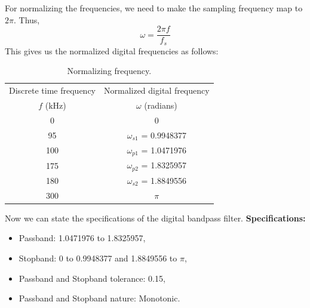 \documentclass[12pt]{article}
\begin{document}
For normalizing the frequencies, we need to make the sampling frequency map to $2\pi$. Thus,
\[\omega = \frac{2\pi f}{f_s}\]
\newpage
This gives us the normalized digital frequencies as follows:
\begin{table}[h]
    \centering
    \begin{tabular}{|c|c|}\hline
         Discrete time frequency&Normalized digital frequency\\
         $f$ (kHz)&$\omega$ (radians)\\\hline
         0&0\\\hline
         95&$\omega_{s1}$ = 0.9948377\\\hline
         100&$\omega_{p1}$ = 1.0471976\\\hline
         175&$\omega_{p2}$ = 1.8325957\\\hline
         180&$\omega_{s2}$ = 1.8849556\\\hline
         300&$\pi$\\\hline
    \end{tabular}
    \caption{Normalizing frequency.}
    \label{tab:1}
\end{table}

Now we can state the specifications of the digital bandpass filter.
\newline
\hline
\vspace{10pt}
\textbf{Specifications:}
\begin{itemize}
    \item Passband: 1.0471976 to 1.8325957,
    \item Stopband: 0 to 0.9948377 and 1.8849556 to  $\pi$,
    \item Passband and Stopband tolerance: 0.15,
    \item Passband and Stopband nature: Monotonic.
\end{itemize}
\hline
\end{document}
